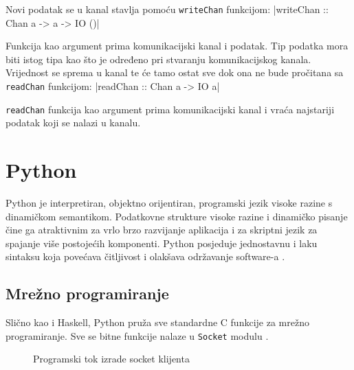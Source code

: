 Novi podatak se u kanal stavlja pomoću \texttt{writeChan}
funkcijom:
|writeChan :: Chan a -> a -> IO ()|

Funkcija kao argument prima komunikacijski kanal i podatak. Tip podatka mora
biti istog tipa kao što je određeno pri stvaranju komunikacijskog kanala.
Vrijednost se sprema u kanal te će tamo ostat sve dok ona ne bude pročitana sa
\texttt{readChan} funkcijom:
|readChan :: Chan a -> IO a|

\texttt{readChan} funkcija kao argument prima komunikacijski kanal
i vraća najstariji podatak koji se nalazi u kanalu.

\newpage
\section{Python}

Python je interpretiran, objektno orijentiran, programski jezik visoke razine
s dinamičkom semantikom. Podatkovne strukture visoke razine i dinamičko pisanje
čine ga atraktivnim za vrlo brzo razvijanje aplikacija i za skriptni jezik za
spajanje više postojećih komponenti.
Python posjeduje jednostavnu i laku sintaksu koja povećava čitljivost i
olakšava održavanje software-a \cite{python_ref}.

\subsection{Mrežno programiranje}

Slično kao i Haskell, Python pruža sve standardne C funkcije za mrežno
programiranje. Sve se bitne funkcije nalaze u \texttt{Socket}
modulu \cite{python_socket}.

\begin{figure}[H]
\centering
{}
\caption{Programski tok izrade socket klijenta}
\label{fig:client_creation}
\end{figure}

